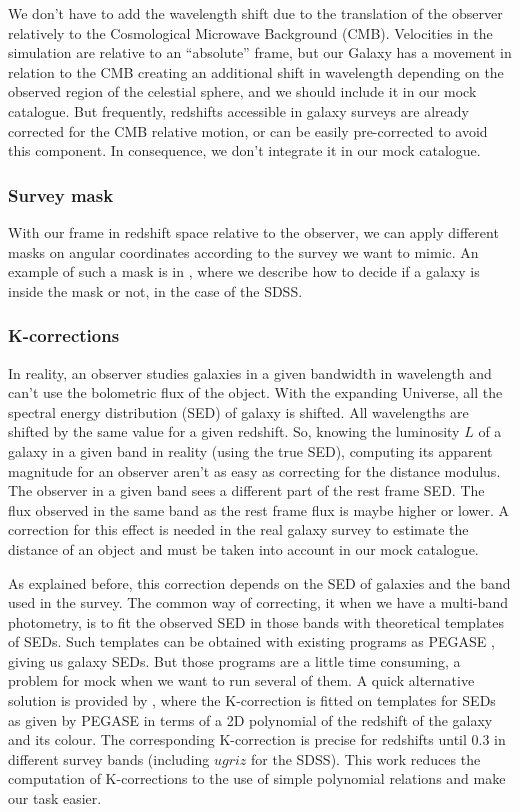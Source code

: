 We don't have to add the wavelength shift due to the translation of the
observer relatively to the Cosmological Microwave Background (CMB). Velocities
in the simulation are relative to an ``absolute'' frame, but our Galaxy has a
movement in relation to the CMB creating an additional shift in wavelength
depending on the observed region of the celestial sphere, and we should include
it in our mock catalogue. But frequently, redshifts accessible in galaxy
surveys are already corrected for the CMB relative motion, or can be easily
pre-corrected to avoid this component. In consequence, we don't integrate it in
our mock catalogue.

\subsubsection{Survey mask}

With our frame in redshift space relative to the observer, we can apply
different masks on angular coordinates according to the survey we want to
mimic. An example of such a mask is in , where we describe
how to decide if a galaxy is inside the mask or not, in the case of the SDSS\@.

\subsubsection{K-corrections}

In reality, an observer studies galaxies in a given bandwidth in wavelength and
can't use the bolometric flux of the object. With the expanding Universe, all
the spectral energy distribution (SED) of galaxy is shifted. All wavelengths
are shifted by the same value for a given redshift. So, knowing the luminosity
$L$ of a galaxy in a given band in reality (using the true SED), computing its
apparent magnitude for an observer aren't as easy as correcting for the
distance modulus. The observer in a given band sees a different part of the
rest frame SED\@. The flux observed in the same band as the rest frame flux is
maybe higher or lower. A correction for this effect is needed in the real
galaxy survey to estimate the distance of an object and must be taken into
account in our mock catalogue.

As explained before, this correction depends on the SED of galaxies and the
band used in the survey. The common way of correcting, it when we have a
multi-band photometry, is to fit the observed SED in those bands with
theoretical templates of SEDs. Such templates can be obtained with existing
programs as PEGASE \citep{LeBorgne+04}, giving us galaxy SEDs. But those
programs are a little time consuming, a problem for mock when we want to run
several of them. A quick alternative solution is provided by
\citet{Chilingarian+10}, where the K-correction is fitted on templates for SEDs
as given by PEGASE in terms of a 2D polynomial of the redshift of the galaxy
and its colour. The corresponding K-correction is precise for redshifts until
0.3 in different survey bands (including $ugriz$ for the SDSS). This work
reduces the computation of K-corrections to the use of simple polynomial
relations and make our task easier.

